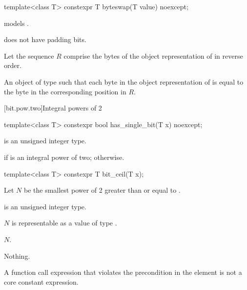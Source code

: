 %
\begin{itemdecl}
template<class T>
  constexpr T byteswap(T value) noexcept;
\end{itemdecl}

\begin{itemdescr}
\pnum
\constraints
{} models .

\pnum
\mandates
{} does not have padding bits.

\pnum
Let the sequence $R$ comprise
the bytes of the object representation of  in reverse order.

\pnum
\returns
An object  of type 
such that each byte in the object representation of  is equal to
the byte in the corresponding position in $R$.
\end{itemdescr}

[bit.pow.two]{Integral powers of 2}

%
\begin{itemdecl}
template<class T>
  constexpr bool has_single_bit(T x) noexcept;
\end{itemdecl}

\begin{itemdescr}
\pnum
\constraints
{} is an unsigned integer type.

\pnum
\returns
{} if  is an integral power of two;
 otherwise.

\end{itemdescr}

%
\begin{itemdecl}
template<class T>
  constexpr T bit_ceil(T x);
\end{itemdecl}

\begin{itemdescr}
\pnum
Let $N$ be the smallest power of 2 greater than or equal to .

\pnum
\constraints
{} is an unsigned integer type.

\pnum
\expects
$N$ is representable as a value of type .

\pnum
\returns
$N$.

\pnum
\throws
Nothing.

\pnum
\remarks
A function call expression
that violates the precondition in the \expects element
is not a core constant expression.
\end{itemdescr}

